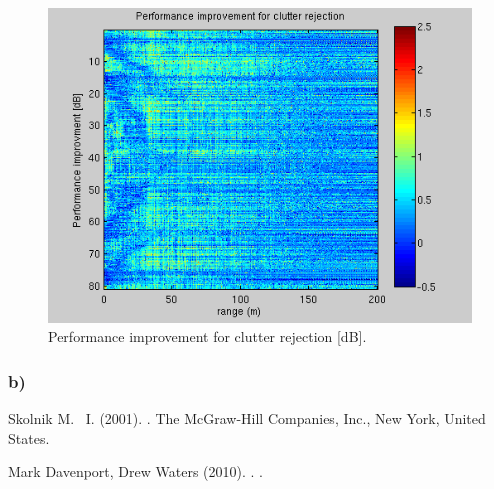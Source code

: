 \documentclass{article}
\begin{document}
\begin{figure}[ht]
\begin{minipage}[b]{0.33\linewidth}
\includegraphics[width=\textwidth]{Figures/improvement_31.png}
\caption{Performance improvement for clutter rejection [dB].}
\label{fig:improvement_31}
\end{minipage}
\end{figure}

\subsubsection{b)}


\newpage
\begin{thebibliography}{9}

Skolnik M. ~I.  (2001).
.
\newblock The McGraw-Hill Companies, Inc., New York, United States.

Mark Davenport, Drew Waters (2010).
.
.

\end{thebibliography}
\end{document}
